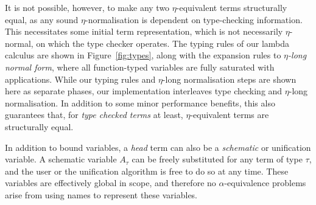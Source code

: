 \documentclass[a4paper]{jfp}
\begin{document}
It is not possible, however, to make any two $\eta$-equivalent terms structurally equal, as
any sound $\eta$-normalisation is dependent on type-checking information. This necessitates some
initial term representation, which is not necessarily $\eta$-normal, on which the type checker
operates. The typing rules of our lambda calculus are shown in Figure~\ref{fig:types}, along
with the expansion rules to \emph{$\eta$-long normal form}, where all function-typed
variables are fully saturated with applications. While our typing rules and $\eta$-long normalisation
steps are shown here as separate phases, our implementation interleaves type checking and 
$\eta$-long normalisation. In addition to some minor performance benefits, this also guarantees that,
for \emph{type checked terms} at least, $\eta$-equivalent terms are structurally equal.

In addition to bound variables, a \emph{head} term can also be a \emph{schematic} or unification
variable. A schematic variable $A_\tau$ can be freely substituted for any term of type $\tau$, and
the user or the unification algorithm is free to do so at any time. These variables are effectively
global in
scope, and therefore no $\alpha$-equivalence 
problems arise from using names to represent these variables.
\end{document}
